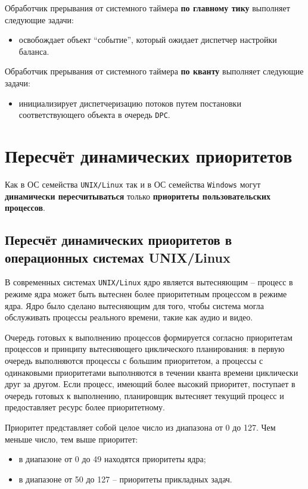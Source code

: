 \documentclass[a4paper,12pt]{bmstu}
\begin{document}
Обработчик прерывания от системного таймера \textbf{по главному тику} выполняет следующие задачи:
\begin{itemize}
    \item освобождает объект ``событие'', который ожидает диспетчер настройки баланса.
\end{itemize}

Обработчик прерывания от системного таймера \textbf{по кванту} выполняет следующие задачи:
\begin{itemize}
    \item инициализирует диспетчеризацию потоков путем постановки соответствующего объекта в очередь \texttt{DPC}.
\end{itemize}


\chapter{Пересчёт динамических приоритетов}

Как в ОС семейства \texttt{UNIX/Linux} так и в ОС семейства \texttt{Windows} могут \textbf{динамически пересчитываться} только \textbf{приоритеты пользовательских процессов}.

\section{Пересчёт динамических приоритетов в операционных системах UNIX/Linux}

В современных системах \texttt{UNIX/Linux} ядро является вытесняющим – процесс в режиме ядра может быть вытеснен более приоритетным процессом в режиме ядра. Ядро было сделано вытесняющим для того, чтобы система могла обслуживать процессы реального времени, такие как аудио и видео.

Очередь готовых к выполнению процессов формируется согласно приоритетам процессов и принципу вытесняющего циклического планирования: в первую очередь выполняются процессы с большим приоритетом, а процессы с одинаковыми приоритетами выполняются в течении кванта времени циклически друг за другом. Если процесс, имеющий более высокий приоритет, поступает в очередь готовых к выполнению, планировщик вытесняет текущий процесс и предоставляет ресурс более приоритетному.

Приоритет представляет собой целое число из диапазона от 0 до 127. Чем меньше число, тем выше приоритет:
\begin{itemize}
    \item в диапазоне от 0 до 49 находятся приоритеты ядра;
    \item в диапазоне от 50 до 127 – приоритеты прикладных задач.
\end{itemize}
\end{document}
